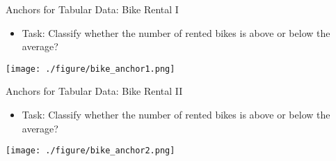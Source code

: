 \documentclass[aspectratio=169]{../latex_main/tntbeamer}  %
\begin{document}
\begin{frame}{Anchors for Tabular Data: Bike Rental I }
    \vspace{-2em}
    \begin{itemize}
        \item Task: Classify whether the number of rented bikes is above or below the average?
    \end{itemize}
    
    \centering
    \texttt{[image: ./figure/bike\_anchor1.png]}
    
\end{frame}

\begin{frame}{Anchors for Tabular Data: Bike Rental II }
    
    \vspace{-2em}
    \begin{itemize}
        \item Task: Classify whether the number of rented bikes is above or below the average?
    \end{itemize}
    
    \centering
    \texttt{[image: ./figure/bike\_anchor2.png]}
    
\end{frame}

	
			
\end{document}
